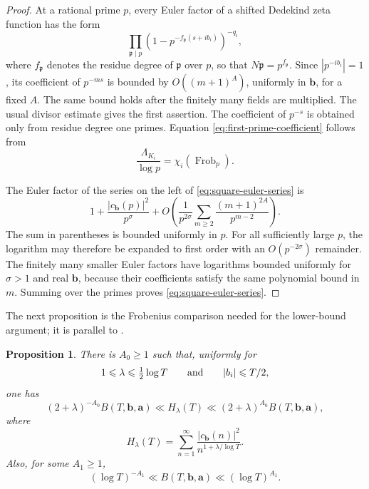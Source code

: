 \documentclass[11pt]{amsart}
\numberwithin{equation}{section}
\theoremstyle{plain}
\newtheorem{prop}[lem]{Proposition}
\renewcommand{\le}{\leqslant}
\renewcommand{\ge}{\geqslant}
\DeclareMathOperator{\Frob}{Frob}
\begin{document}
\begin{proof}
At a rational prime $p$, every Euler factor of a shifted Dedekind zeta
function has the form
\begin{equation*}
\prod_{\mathfrak p\mid p}
(1-p^{-f_{\mathfrak p}(s+ib_i)})^{-q_i},
\end{equation*}
where $f_{\mathfrak p}$ denotes the residue degree of $\mathfrak p$ over
$p$, so that $N\mathfrak p=p^{f_{\mathfrak p}}$.  Since
$|p^{-ib_i}|=1$, its coefficient of $p^{-ms}$ is bounded by
$O((m+1)^A)$, uniformly in $\mathbf b$, for a fixed $A$.  The same bound
holds after the finitely many fields are multiplied.  The usual divisor
estimate gives the first
assertion.  The coefficient of $p^{-s}$ is obtained only from residue
degree one primes.  Equation \eqref{eq:first-prime-coefficient} follows from 
$$\frac{\Lambda_{K_i}}{\log p}=\chi_i(\Frob_p).$$

The Euler factor of the series on the left of
\eqref{eq:square-euler-series} is
\begin{equation*}
1+\frac{|c_{\mathbf b}(p)|^2}{p^\sigma}
+O\left(\frac{1}{p^{2\sigma}}
\sum_{m\ge2}\frac{(m+1)^{2A}}{p^{m-2}}
\right).
\end{equation*}
The sum in parentheses is bounded uniformly in $p$.  For all sufficiently
large $p$, the logarithm may therefore be expanded to first order with an
$O(p^{-2\sigma})$ remainder.  The finitely many smaller Euler factors have
logarithms bounded uniformly for $\sigma>1$ and real $\mathbf b$, because
their coefficients satisfy the same polynomial bound in $m$.  Summing over
the primes proves \eqref{eq:square-euler-series}.
\end{proof}

The next proposition is the Frobenius comparison needed for the lower-bound
argument; it is parallel to \cite[Section~2.3]{DurkanKarakMahatab}.

\begin{prop}\label{prop:square-series-B}
There is $A_0\ge1$ such that, uniformly for
\begin{equation*}
1\le\lambda\le\tfrac12\log T
\qquad\hbox{and}\qquad |b_i|\le T/2,
\end{equation*}
one has
\begin{equation}\label{eq:H-lambda-comparison}
(2+\lambda)^{-A_0}B(T,\mathbf b,\mathbf a)
\ll H_\lambda(T)
\ll(2+\lambda)^{A_0}B(T,\mathbf b,\mathbf a),
\end{equation}
where
\begin{equation}\label{eq:H-lambda-definition}
H_\lambda(T)=\sum_{n=1}^{\infty}
\frac{|c_{\mathbf b}(n)|^2}{n^{1+\lambda/\log T}}.
\end{equation}
Also, for some $A_1\ge1$,
\begin{equation}\label{eq:B-poly}
(\log T)^{-A_1}\ll B(T,\mathbf b,\mathbf a)
\ll(\log T)^{A_1}.
\end{equation}
\end{prop}
\end{document}
